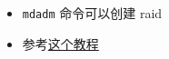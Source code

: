 
\begin{issues}
\issueDraft
\end{issues}

\begin{itemize}
\item \verb|mdadm| 命令可以创建 raid
\item 参考\href{https://www.digitalocean.com/community/tutorials/how-to-create-raid-arrays-with-mdadm-on-ubuntu-22-04}{这个教程}
\end{itemize}

